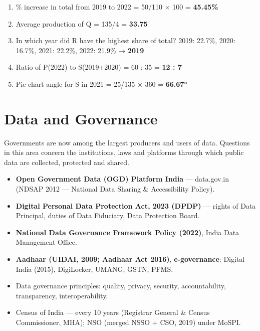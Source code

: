 \endgroup



\begin{enumerate}
\def\labelenumi{\arabic{enumi}.}
\tightlist
\item
  \% increase in total from 2019 to 2022 = 50/110 × 100 = \textbf{45.45\%}
\item
  Average production of Q = 135/4 = \textbf{33.75}
\item
  In which year did R have the highest share of total? 2019: 22.7\%, 2020: 16.7\%, 2021: 22.2\%, 2022: 21.9\% → \textbf{2019}
\item
  Ratio of P(2022) to S(2019+2020) = 60 : 35 = \textbf{12 : 7}
\item
  Pie-chart angle for S in 2021 = 25/135 × 360 = \textbf{66.67°}
\end{enumerate}

\needspace{125pt}

\hypertarget{p1-07--6-data-and-governance}{%
\section{Data and Governance}\label{p1-07--6-data-and-governance}}

Governments are now among the largest producers and users of data. Questions in this area concern the
institutions, laws and platforms through which public data are collected, protected and shared.

\begin{itemize}
\tightlist
\item
  \textbf{Open Government Data (OGD) Platform India} --- data.gov.in (NDSAP 2012 --- National Data Sharing \& Accessibility Policy).
\item
  \textbf{Digital Personal Data Protection Act, 2023 (DPDP)} --- rights of Data Principal, duties of Data Fiduciary, Data Protection Board.
\item
  \textbf{National Data Governance Framework Policy (2022)}, India Data Management Office.
\item
  \textbf{Aadhaar (UIDAI, 2009; Aadhaar Act 2016)}, \textbf{e-governance}: Digital India (2015), DigiLocker, UMANG, GSTN, PFMS.
\item
  Data governance principles: quality, privacy, security, accountability, transparency, interoperability.
\item
  Census of India --- every 10 years (Registrar General \& Census Commissioner, MHA); NSO (merged NSSO + CSO, 2019) under MoSPI.
\end{itemize}

